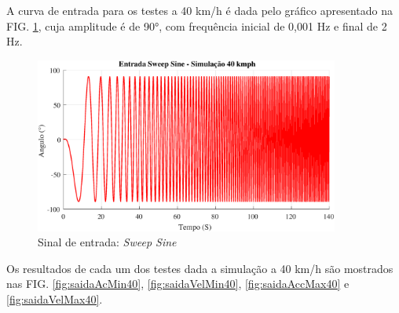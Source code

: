 \documentclass[a4paper, 12pt]{article}
\begin{document}
A curva de entrada para os testes a 40 km/h é dada pelo gráfico apresentado na FIG. \ref{fig:entrada40}, cuja amplitude é de 90\si{\degree}, com frequência inicial de 0,001 Hz e final de 2 Hz.
\begin{figure}[H]
\centering
\includegraphics[width=10cm]{imagens/sweep40.eps}
\caption{Sinal de entrada: \textit{Sweep Sine}}
\label{fig:entrada40}
\end{figure}

Os resultados de cada um dos testes dada a simulação a 40 km/h são mostrados nas FIG. \ref{fig:saidaAcMin40}, \ref{fig:saidaVelMin40}, \ref{fig:saidaAccMax40} e \ref{fig:saidaVelMax40}.
\end{document}
